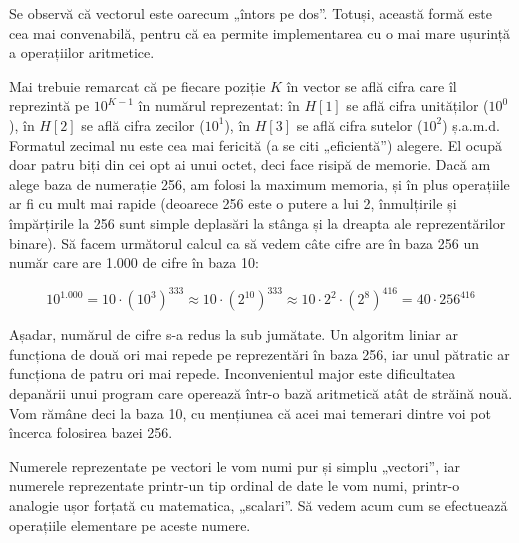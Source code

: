 
Se observă că vectorul este oarecum „întors pe dos”. Totuși, această formă
este cea mai convenabilă, pentru că ea permite implementarea cu o mai mare
ușurință a operațiilor aritmetice.

Mai trebuie remarcat că pe fiecare poziție $K$ în vector se află cifra care îl
reprezintă pe $10^{K-1}$ în numărul reprezentat: în $H[1]$ se află cifra
unităților ($10^0$), în $H[2]$ se află cifra zecilor ($10^1$), în $H[3]$ se
află cifra sutelor ($10^2$) ș.a.m.d. Formatul zecimal nu este cea mai fericită
(a se citi „eficientă”) alegere. El ocupă doar patru biți din cei opt ai unui
octet, deci face risipă de memorie. Dacă am alege baza de numerație 256, am
folosi la maximum memoria, și în plus operațiile ar fi cu mult mai rapide
(deoarece 256 este o putere a lui 2, înmulțirile și împărțirile la 256 sunt
simple deplasări la stânga și la dreapta ale reprezentărilor binare). Să facem
următorul calcul ca să vedem câte cifre are în baza 256 un număr care are
1.000 de cifre în baza 10:

\begin{equation}
  10^{1.000} =
  10 \cdot (10^3)^{333} \approx
  10 \cdot (2^{10})^{333} \approx
  10 \cdot 2^2 \cdot (2^8)^{416} =
  40 \cdot 256^{416}
\end{equation}
	
Așadar, numărul de cifre s-a redus la sub jumătate. Un algoritm liniar ar
funcționa de două ori mai repede pe reprezentări în baza 256, iar unul
pătratic ar funcționa de patru ori mai repede. Inconvenientul major este
dificultatea depanării unui program care operează într-o bază aritmetică atât
de străină nouă. Vom rămâne deci la baza 10, cu mențiunea că acei mai temerari
dintre voi pot încerca folosirea bazei 256.

Numerele reprezentate pe vectori le vom numi pur și simplu „vectori”, iar
numerele reprezentate printr-un tip ordinal de date le vom numi, printr-o
analogie ușor forțată cu matematica, „scalari”. Să vedem acum cum se
efectuează operațiile elementare pe aceste numere.

